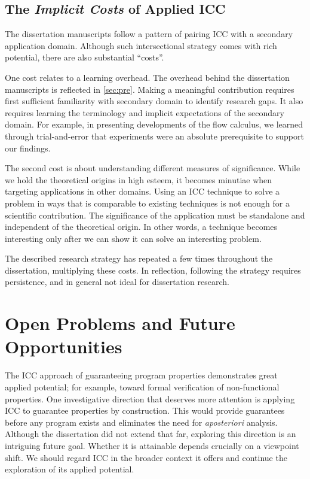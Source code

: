 \subsection{The \emph{Implicit Costs} of Applied ICC}
\label{subsec:res-meta}

The dissertation manuscripts follow a pattern of pairing ICC with a secondary application domain.
Although such intersectional strategy comes with rich potential, there are also substantial \enquote{costs}.

One cost relates to a learning overhead.
The overhead behind the dissertation manuscripts is reflected in \autoref{sec:pre}.
Making a meaningful contribution requires first sufficient familiarity with secondary domain to identify research gaps.
It also requires learning the terminology and implicit expectations of the secondary domain.
For example, in presenting developments of the flow calculus, we learned through trial-and-error that experiments were an absolute prerequisite to support our findings.

The second cost is about understanding different measures of significance.
While we hold the theoretical origins in high esteem, it becomes minutiae when targeting applications in other domains.
Using an ICC technique to solve a problem in ways that is comparable to existing techniques is not enough for a scientific contribution.
The significance of the application must be standalone and independent of the theoretical origin.
In other words, a technique becomes interesting only after we can show it can solve an interesting problem.

The described research strategy has repeated a few times throughout the dissertation, multiplying these costs.
In reflection, following the strategy requires persistence, and in general not ideal for dissertation research.

\section{Open Problems and Future Opportunities}
\label{sec:res-future}

The ICC approach of guaranteeing program properties demonstrates great applied potential;
for example, toward formal verification of non-functional properties.
One investigative direction that deserves more attention is applying ICC to guarantee properties by construction.
This would provide guarantees before any program exists and eliminates the need for \emph{aposteriori} analysis.
Although the dissertation did not extend that far, exploring this direction is an intriguing future goal.
Whether it is attainable depends crucially on a viewpoint shift.
We should regard ICC in the broader context it offers and continue the exploration of its applied potential.

